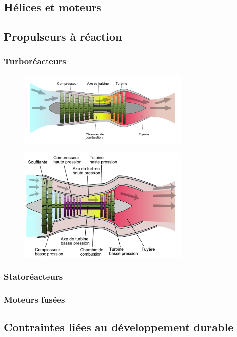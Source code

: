 	\subsection{Hélices et moteurs}
	
	\subsection{Propulseurs à réaction}
		\subsubsection{Turboréacteurs}
		
		\begin{figure}[H]
  		\centering
    		\includegraphics[width=0.75\textwidth]{01-EtudeAeronefs/img/turbomachines/turboreacteur-simpleFlux.pdf}
		\end{figure}	
	
		\begin{figure}[H]
  		\centering
    		\includegraphics[width=0.75\textwidth]{01-EtudeAeronefs/img/turbomachines/turboreacteur-doubeFlux.pdf}
		\end{figure}	
	
		\subsubsection{Statoréacteurs}
	
		\subsubsection{Moteurs fusées}
		
	\subsection{Contraintes liées au développement durable}
